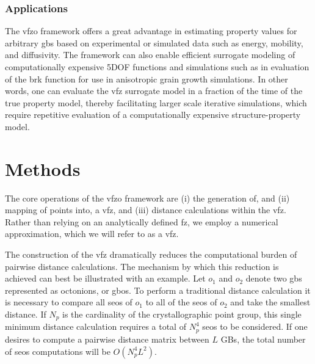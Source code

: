 \documentclass[preprint,12pt]{elsarticle}
\begin{document}
\subsubsection{Applications}

The \gls{vfzo} framework offers a great advantage in estimating property values for arbitrary \glspl{gb} based on experimental or simulated data such as energy, mobility, and diffusivity. The framework can also enable efficient surrogate modeling of computationally expensive 5DOF functions and simulations such as in evaluation of the \gls{brk} function for use in anisotropic grain growth simulations. In other words, one can evaluate the \gls{vfz} surrogate model in a fraction of the time of the true property model, thereby facilitating larger scale iterative simulations, which require repetitive evaluation of a computationally expensive structure-property model.


\section{Methods} \label{sec:methods}

The core operations of the \gls{vfzo} framework are (i) the generation of, and (ii) mapping of points into, a \gls{vfz}, and (iii) distance calculations within the \gls{vfz}. Rather than relying on an analytically defined \gls{fz}, we employ a numerical approximation, which we will refer to as a \gls{vfz}.

The construction of the \gls{vfz} dramatically reduces the computational burden of pairwise distance calculations. The mechanism by which this reduction is achieved can best be illustrated with an example. Let $o_1$ and $o_2$ denote two \glspl{gb} represented as octonions, or \glspl{gbo}. 
To perform a traditional distance calculation it is necessary to compare all \glspl{seo} of $o_1$ to all of the \glspl{seo} of $o_2$ and take the smallest distance. If $N_p$ is the cardinality of the crystallographic point group, this single minimum distance calculation requires a total of $N_p^4$ \glspl{seo} to be considered. If one desires to compute a pairwise distance matrix between $L$ GBs, the total number of \glspl{seo} computations will be $O(N_p^4L^2)$.
\end{document}
